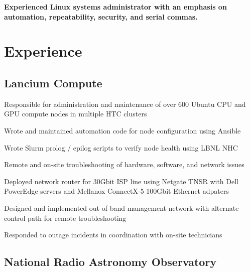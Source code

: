 \documentclass[letterpaper]{deedy-resume-openfont}
\begin{document}
\begin{minipage}[t]{0.69\textwidth} %
\vspace{3pt}
\newcommand{\summary}[1]{ %
\raggedright\bfseries { #1 \\}
\hrulefill
}

\summary{Experienced Linux systems administrator with an emphasis on automation, repeatability, security, and serial commas.} 

\section{Experience}

\subsection{Lancium Compute}

\begin{tightemize}
	\item Responsible for administration and maintenance of over 600 Ubuntu CPU and GPU compute nodes in multiple HTC clusters
	\item Wrote and maintained automation code for node configuration using Ansible
	\item Wrote Slurm prolog / epilog scripts to verify node health using LBNL NHC
	\item Remote and on-site troubleshooting of hardware, software, and network issues
	\item Deployed network router for 30Gbit ISP line using Netgate TNSR with Dell PowerEdge servers and Mellanox ConnectX-5 100Gbit Ethernet adpaters
	\item Designed and implemented out-of-band management network with alternate control path for remote troubleshooting
	\item Responded to outage incidents in coordination with on-site technicians
\end{tightemize}
\vspace{6pt}

\subsection{National Radio Astronomy Observatory}


\end{minipage}
\end{document}
